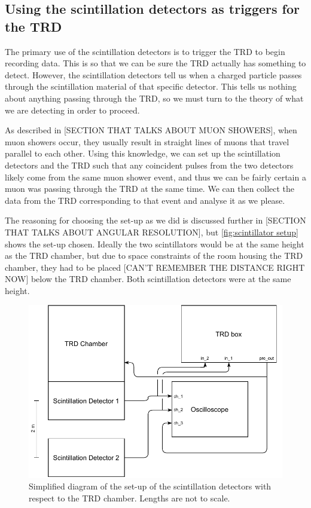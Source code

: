\documentclass[11pt]{article}
\numberwithin{equation}{section}
\numberwithin{figure}{section}
\numberwithin{table}{section}
\begin{document}
\subsection{Using the scintillation detectors as triggers for the TRD}\label{sec:scintillators as triggers}
\par The primary use of the scintillation detectors is to trigger the TRD to begin recording data. This is so that we can be sure the TRD actually has something to detect. However, the scintillation detectors tell us when a charged particle passes through the scintillation material of that specific detector. This tells us nothing about anything passing through the TRD, so we must turn to the theory of what we are detecting in order to proceed.
\par As described in [SECTION THAT TALKS ABOUT MUON SHOWERS], when muon showers occur, they usually result in straight lines of muons that travel parallel to each other. Using this knowledge, we can set up the scintillation detectors and the TRD such that any coincident pulses from the two detectors likely come from the same muon shower event, and thus we can be fairly certain a muon was passing through the TRD at the same time. We can then collect the data from the TRD corresponding to that event and analyse it as we please.
\par The reasoning for choosing the set-up as we did is discussed further in [SECTION THAT TALKS ABOUT ANGULAR RESOLUTION], but \autoref{fig:scintillator setup} shows the set-up chosen. Ideally the two scintillators would be at the same height as the TRD chamber, but due to space constraints of the room housing the TRD chamber, they had to be placed [CAN'T REMEMBER THE DISTANCE RIGHT NOW] below the TRD chamber. Both scintillation detectors were at the same height.

\begin{figure}[h]
    \begin{center}
        \includegraphics{Plots/setup.pdf}
        \caption{Simplified diagram of the set-up of the scintillation detectors with respect to the TRD chamber. Lengths are not to scale.}
        \label{fig:scintillator setup}
    \end{center}
\end{figure}
\end{document}
